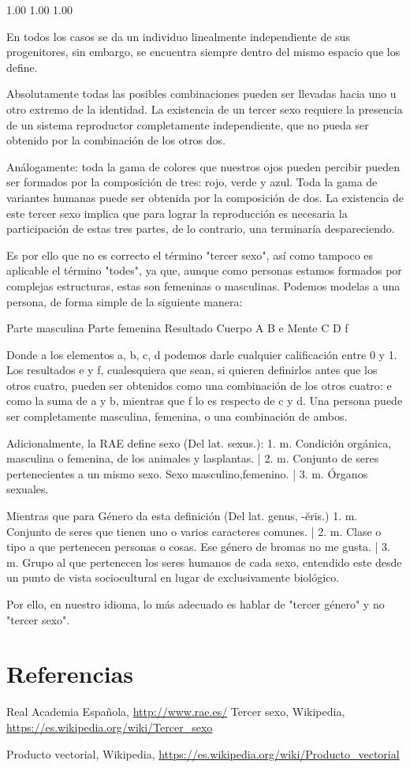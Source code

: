 1.00
1.00
1.00

En todos los casos se da un individuo linealmente independiente de sus progenitores, sin embargo, se encuentra siempre dentro del mismo espacio que los define.

Absolutamente todas las posibles combinaciones pueden ser llevadas hacia uno u otro extremo de la identidad. La existencia de un tercer sexo requiere la presencia de un sistema reproductor completamente independiente, que no pueda ser obtenido por la combinación de los otros dos.

Análogamente: toda la gama de colores que nuestros ojos pueden percibir pueden ser formados por la composición de tres: rojo, verde y azul. Toda la gama de variantes humanas puede ser obtenida por la composición de dos. La existencia de este tercer sexo implica que para lograr la reproducción es necesaria la participación de estas tres partes, de lo contrario, una terminaría despareciendo.

Es por ello que no es correcto el término "tercer sexo", así como tampoco es aplicable el término "todes", ya que, aunque como personas estamos formados por complejas estructuras, estas son femeninas o masculinas. Podemos modelas a una persona, de forma simple de la siguiente manera: 

Parte masculina
Parte femenina
Resultado
Cuerpo
A
B
e
Mente
C
D
f

Donde a los elementos {a, b, c, d} podemos darle cualquier calificación entre 0 y 1. Los resultados e y f, cualesquiera que sean, si quieren definirlos antes que los otros cuatro, pueden ser obtenidos como una combinación de los otros cuatro: e como la suma de a y b, mientras que f lo es respecto de c y d. Una persona puede ser completamente masculina, femenina, o una combinación de ambos.

Adicionalmente, la RAE define sexo (Del lat. sexus.): 1. m. Condición orgánica, masculina o femenina, de los animales y lasplantas. | 2. m. Conjunto de seres pertenecientes a un mismo sexo. Sexo masculino,femenino. | 3. m. Órganos sexuales.

Mientras que para Género da esta definición (Del lat. genus, -ĕris.) 1. m. Conjunto de seres que tienen uno o varios caracteres comunes. | 2. m. Clase o tipo a que pertenecen personas o cosas. Ese género de bromas no me gusta. | 3. m. Grupo al que pertenecen los seres humanos de cada sexo, entendido este desde un punto de vista sociocultural en lugar de exclusivamente biológico.

Por ello, en nuestro idioma, lo más adecuado es hablar de "tercer género" y no "tercer sexo".
\section{Referencias}
Real Academia Española, \url{http://www.rae.es/}
Tercer sexo, Wikipedia, \url{https://es.wikipedia.org/wiki/Tercer_sexo}

Producto vectorial, Wikipedia, \url{https://es.wikipedia.org/wiki/Producto_vectorial}
